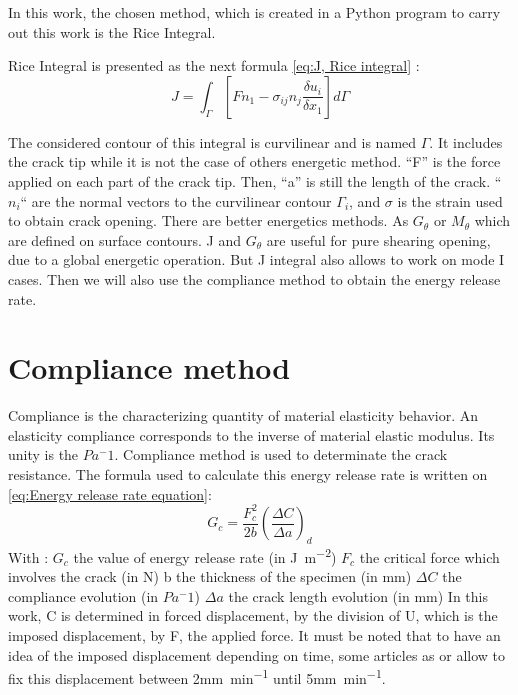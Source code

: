 In this work, the chosen method, which is created in a Python program to carry out this work is the Rice Integral.

Rice Integral is presented as the next formula \ref{eq:J, Rice integral} :
\begin{equation}
	J=\int_{\Gamma}[F n_{1}-\sigma_{ij} n_{j} \frac{\delta u_{i}}{\delta x_{1}}]d\Gamma
	\label{eq:J, Rice integral}
\end{equation}  

The considered contour of this integral is curvilinear and is named $\Gamma$. It includes the crack tip while it is not the case of others energetic method. “F” is the force applied on each part of the crack tip. Then, “a” is still the length of the crack. “$n_i$“ are the normal vectors to the curvilinear contour $\Gamma_{i}$, and $\sigma$ is the strain used to obtain crack opening. 
There are better energetics methods. As $G_{\theta}$ or $M_{\theta}$ which are defined on surface contours. J and $G_{\theta}$ are useful for pure shearing opening, due to a global energetic operation. But J integral also allows to work on mode I cases. Then we will also use the compliance method to obtain the energy release rate.


\section{Compliance method}

Compliance is the characterizing quantity of material elasticity behavior. An elasticity compliance corresponds to the inverse of material elastic modulus. Its unity is the $Pa^-1$.
Compliance method is used to determinate the crack resistance. 
The formula used to calculate this energy release rate is written on \ref{eq:Energy release rate equation}:
\begin{equation}
	G_{c}= \frac{F_{c}^2}{2b} (\frac{\Delta C}{\Delta a})_{d} 	
	\label{eq:Energy release rate equation}
\end{equation}  
With : 
$G_c$ the value of energy release rate (in \si{\joule\per\square\meter})
$F_c$ the critical force which involves the crack (in \si{\newton})
b the thickness of the specimen (in \si{\milli\meter})
$\Delta C$ the compliance evolution (in $Pa^-1$)
$\Delta a$ the crack length evolution (in \si{\milli\meter})
In this work, C is determined in forced displacement, by the division of U, which is the imposed displacement, by F, the applied force. It must be noted that to have an idea of the imposed displacement depending on time, some articles as \parencite{Reference7} or \parencite{reference15} allow to fix this displacement between 2\si{\milli\meter\per\minute} until 5\si{\milli\meter\per\minute}.

